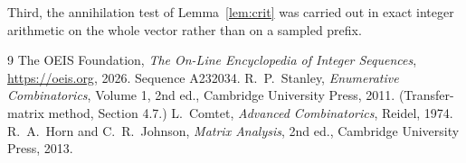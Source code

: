 \documentclass[11pt,a4paper]{article}
\theoremstyle{plain}
\theoremstyle{definition}
\begin{document}
Third, the annihilation test of Lemma~\ref{lem:crit} was carried out in exact integer
arithmetic on the whole vector rather than on a sampled prefix.

\begin{thebibliography}{9}
 The OEIS Foundation, \emph{The On-Line Encyclopedia of Integer
Sequences}, \url{https://oeis.org}, 2026. Sequence A232034.
 R.~P.~Stanley, \emph{Enumerative Combinatorics}, Volume 1, 2nd ed.,
Cambridge University Press, 2011. (Transfer-matrix method, Section 4.7.)
 L.~Comtet, \emph{Advanced Combinatorics}, Reidel, 1974.
 R.~A.~Horn and C.~R.~Johnson, \emph{Matrix Analysis}, 2nd ed., Cambridge
University Press, 2013.
\end{thebibliography}
\end{document}
